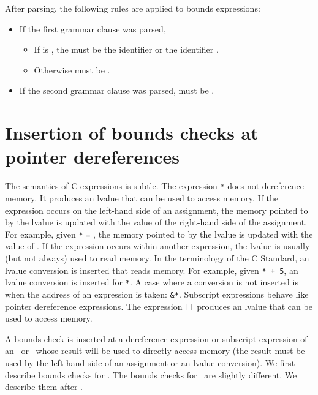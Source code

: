 After parsing, the following rules are applied to bounds
expressions:
\begin{itemize}
\item If the first grammar clause was parsed,
\begin{itemize}
\item If  is , the 
must be the identifier  or the identifier .
\item Otherwise  must be .
\end{itemize}
\item If the second grammar clause was parsed,  must be
.
\end{itemize}

\section{Insertion of bounds checks at pointer dereferences}

\label{section:bounds-checking-indirections}
The semantics of C expressions is subtle.  The expression
\lstinline|*| does not dereference memory.  It
produces an lvalue that can be used to access memory. If the expression
occurs on the left-hand side of an assignment, the memory pointed to
by the lvalue is updated with the value of the right-hand side of
the assignment.
For example, given \lstinline|*| \lstinline|=| ,
the memory pointed to by the lvalue is updated with the value of .
If the expression occurs within another expression, the lvalue is usually
(but not always)  used to read memory.  In the terminology of the C Standard,
an lvalue conversion is inserted that reads memory. For example, given
\lstinline|*|\lstinline| + 5|,
an lvalue conversion is inserted for \lstinline|*|.  A case where a
conversion is not inserted is  when the address of an expression is taken:
\lstinline|&*|. Subscript expressions behave like pointer
dereference expressions.  The expression \lstinline|[|\lstinline|]| produces
an lvalue that can be used to access memory.

A bounds check is inserted at a dereference expression or subscript expression
of an \arrayptr\ or \ntarrayptr\ whose result will be used to directly
access memory (the result must be used by the left-hand side of an
assignment or an lvalue conversion).   We first describe bounds checks
for \arrayptr.   The bounds checks for \ntarrayptr\ are slightly
different.  We describe them after \arrayptr.

